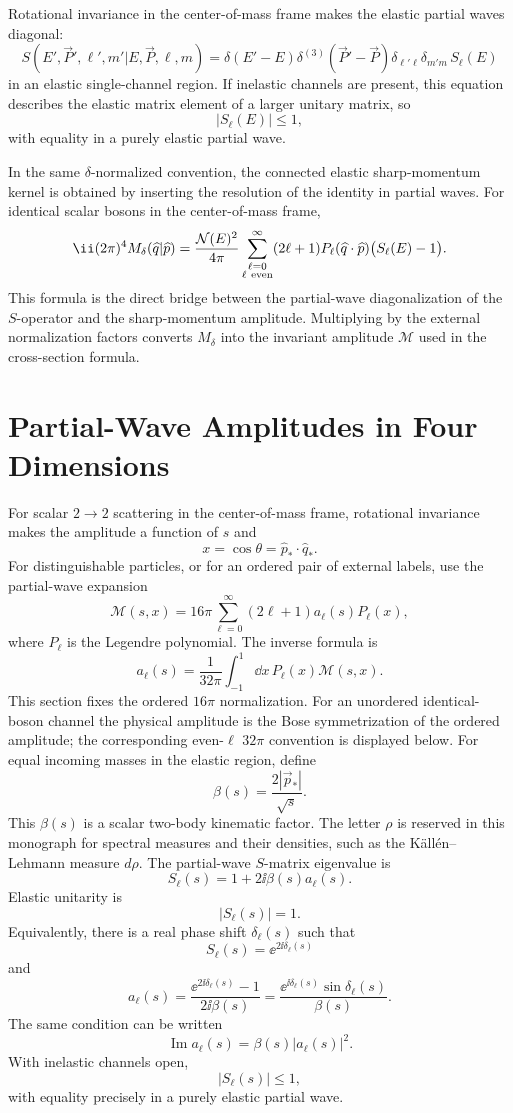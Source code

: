 Rotational invariance in the center-of-mass frame makes the elastic partial
waves diagonal:
\[
  S(E',\vec P',\ell',m'|E,\vec P,\ell,m)
  =
  \delta(E'-E)\delta^{(3)}(\vec P'-\vec P)
  \delta_{\ell'\ell}\delta_{m'm}\,S_\ell(E)
\]
in an elastic single-channel region.  If inelastic channels are present, this
equation describes the elastic matrix element of a larger unitary matrix, so
\[
  |S_\ell(E)|\le 1,
\]
with equality in a purely elastic partial wave.

In the same \(\delta\)-normalized convention, the connected elastic
sharp-momentum kernel is obtained by inserting the resolution of the identity
in partial waves.  For identical scalar bosons in the center-of-mass frame,
\[
  \ii(2\pi)^4M_\delta(\widehat q|\widehat p)
  =
  \frac{\mathcal N(E)^2}{4\pi}
  \sum_{\substack{\ell=0\\ \ell\ {\rm even}}}^{\infty}
  (2\ell+1)P_\ell(\widehat q\cdot\widehat p)
  \bigl(S_\ell(E)-1\bigr).
\]
This formula is the direct bridge between the partial-wave diagonalization of
the \(S\)-operator and the sharp-momentum amplitude.  Multiplying by the
external normalization factors converts \(M_\delta\) into the invariant
amplitude \(\mathcal M\) used in the cross-section formula.

\section{Partial-Wave Amplitudes in Four Dimensions}

For scalar \(2\to2\) scattering in the center-of-mass frame, rotational
invariance makes the amplitude a function of \(s\) and
\[
  x=\cos\theta=\widehat p_*\cdot\widehat q_* .
\]
For distinguishable particles, or for an ordered pair of external labels, use
the partial-wave expansion
\[
  \mathcal M(s,x)
  =
  16\pi
  \sum_{\ell=0}^{\infty}
  (2\ell+1)a_\ell(s)P_\ell(x),
\]
where \(P_\ell\) is the Legendre polynomial.  The inverse formula is
\[
  a_\ell(s)
  =
  \frac{1}{32\pi}
  \int_{-1}^1\dd x\,
  P_\ell(x)\mathcal M(s,x).
\]
This section fixes the ordered \(16\pi\) normalization.  For an unordered
identical-boson channel the physical amplitude is the Bose symmetrization of
the ordered amplitude; the corresponding even-\(\ell\) \(32\pi\) convention is
displayed below.
For equal incoming masses in the elastic region, define
\[
  \beta(s)=\frac{2|\vec p_*|}{\sqrt s}.
\]
This \(\beta(s)\) is a scalar two-body kinematic factor.  The letter
\(\rho\) is reserved in this monograph for spectral measures and their
densities, such as the K\"all\'en--Lehmann measure \(d\rho\).
The partial-wave \(S\)-matrix eigenvalue is
\[
  S_\ell(s)=1+2\ii\beta(s)a_\ell(s).
\]
Elastic unitarity is
\[
  |S_\ell(s)|=1.
\]
Equivalently, there is a real phase shift \(\delta_\ell(s)\) such that
\[
  S_\ell(s)=\ee^{2\ii\delta_\ell(s)}
\]
and
\[
  a_\ell(s)
  =
  \frac{\ee^{2\ii\delta_\ell(s)}-1}{2\ii\beta(s)}
  =
  \frac{\ee^{\ii\delta_\ell(s)}\sin\delta_\ell(s)}{\beta(s)} .
\]
The same condition can be written
\[
  \operatorname{Im}a_\ell(s)=\beta(s)|a_\ell(s)|^2 .
\]
With inelastic channels open,
\[
  |S_\ell(s)|\le1,
\]
with equality precisely in a purely elastic partial wave.

